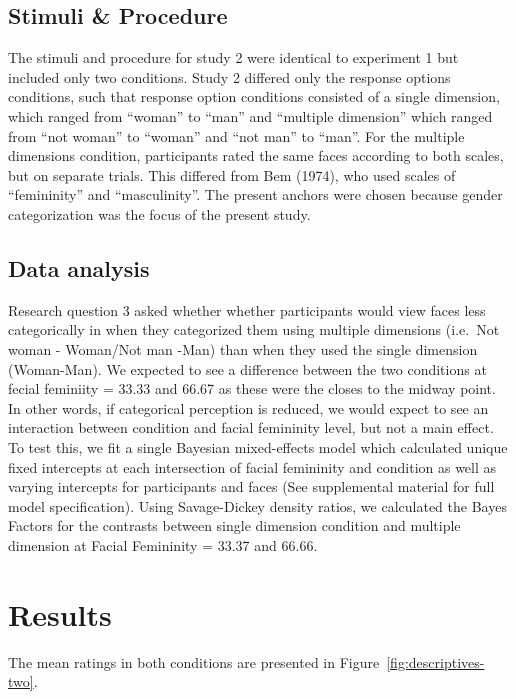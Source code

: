 \documentclass[
  man]{apa7}
\begin{document}
\hypertarget{stimuli-procedure}{%
\subsection{Stimuli \& Procedure}\label{stimuli-procedure}}

The stimuli and procedure for study 2 were identical to experiment 1 but included only two conditions. Study 2 differed only the response options conditions, such that response option conditions consisted of a single dimension, which ranged from ``woman'' to ``man'' and ``multiple dimension'' which ranged from ``not woman'' to ``woman'' and ``not man'' to ``man''. For the multiple dimensions condition, participants rated the same faces according to both scales, but on separate trials. This differed from Bem (1974), who used scales of ``femininity'' and ``masculinity''. The present anchors were chosen because gender categorization was the focus of the present study.

\hypertarget{data-analysis-1}{%
\subsection{Data analysis}\label{data-analysis-1}}

Research question 3 asked whether whether participants would view faces less categorically in when they categorized them using multiple dimensions (i.e.~Not woman - Woman/Not man -Man) than when they used the single dimension (Woman-Man). We expected to see a difference between the two conditions at fecial feminiity = 33.33 and 66.67 as these were the closes to the midway point. In other words, if categorical perception is reduced, we would expect to see an interaction between condition and facial femininity level, but not a main effect. To test this, we fit a single Bayesian mixed-effects model which calculated unique fixed intercepts at each intersection of facial femininity and condition as well as varying intercepts for participants and faces (See supplemental material for full model specification). Using Savage-Dickey density ratios, we calculated the Bayes Factors for the contrasts between single dimension condition and multiple dimension at Facial Femininity = 33.37 and 66.66.

\hypertarget{results-1}{%
\section{Results}\label{results-1}}

The mean ratings in both conditions are presented in Figure~\ref{fig:descriptives-two}.
\end{document}
